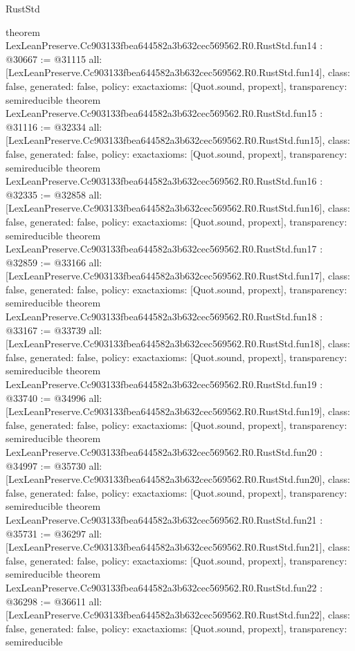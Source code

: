 \begin{lexlean}{RustStd}
\begin{coremodule}
{}
theorem LexLeanPreserve.Cc903133fbea644582a3b632cec569562.R0.RustStd.fun14 : @30667 := @31115 {
  all: [LexLeanPreserve.Cc903133fbea644582a3b632cec569562.R0.RustStd.fun14],
  class: false,
  generated: false,
  policy: exact{axioms: [Quot.sound, propext]},
  transparency: semireducible
}
theorem LexLeanPreserve.Cc903133fbea644582a3b632cec569562.R0.RustStd.fun15 : @31116 := @32334 {
  all: [LexLeanPreserve.Cc903133fbea644582a3b632cec569562.R0.RustStd.fun15],
  class: false,
  generated: false,
  policy: exact{axioms: [Quot.sound, propext]},
  transparency: semireducible
}
theorem LexLeanPreserve.Cc903133fbea644582a3b632cec569562.R0.RustStd.fun16 : @32335 := @32858 {
  all: [LexLeanPreserve.Cc903133fbea644582a3b632cec569562.R0.RustStd.fun16],
  class: false,
  generated: false,
  policy: exact{axioms: [Quot.sound, propext]},
  transparency: semireducible
}
theorem LexLeanPreserve.Cc903133fbea644582a3b632cec569562.R0.RustStd.fun17 : @32859 := @33166 {
  all: [LexLeanPreserve.Cc903133fbea644582a3b632cec569562.R0.RustStd.fun17],
  class: false,
  generated: false,
  policy: exact{axioms: [Quot.sound, propext]},
  transparency: semireducible
}
theorem LexLeanPreserve.Cc903133fbea644582a3b632cec569562.R0.RustStd.fun18 : @33167 := @33739 {
  all: [LexLeanPreserve.Cc903133fbea644582a3b632cec569562.R0.RustStd.fun18],
  class: false,
  generated: false,
  policy: exact{axioms: [Quot.sound, propext]},
  transparency: semireducible
}
theorem LexLeanPreserve.Cc903133fbea644582a3b632cec569562.R0.RustStd.fun19 : @33740 := @34996 {
  all: [LexLeanPreserve.Cc903133fbea644582a3b632cec569562.R0.RustStd.fun19],
  class: false,
  generated: false,
  policy: exact{axioms: [Quot.sound, propext]},
  transparency: semireducible
}
theorem LexLeanPreserve.Cc903133fbea644582a3b632cec569562.R0.RustStd.fun20 : @34997 := @35730 {
  all: [LexLeanPreserve.Cc903133fbea644582a3b632cec569562.R0.RustStd.fun20],
  class: false,
  generated: false,
  policy: exact{axioms: [Quot.sound, propext]},
  transparency: semireducible
}
theorem LexLeanPreserve.Cc903133fbea644582a3b632cec569562.R0.RustStd.fun21 : @35731 := @36297 {
  all: [LexLeanPreserve.Cc903133fbea644582a3b632cec569562.R0.RustStd.fun21],
  class: false,
  generated: false,
  policy: exact{axioms: [Quot.sound, propext]},
  transparency: semireducible
}
theorem LexLeanPreserve.Cc903133fbea644582a3b632cec569562.R0.RustStd.fun22 : @36298 := @36611 {
  all: [LexLeanPreserve.Cc903133fbea644582a3b632cec569562.R0.RustStd.fun22],
  class: false,
  generated: false,
  policy: exact{axioms: [Quot.sound, propext]},
  transparency: semireducible
}
\end{coremodule}
\end{lexlean}
